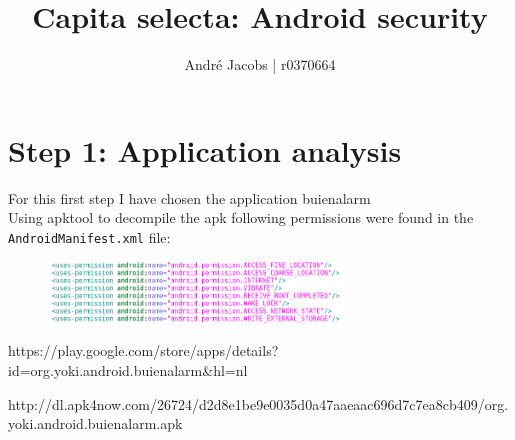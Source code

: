 \documentclass[10pt,a4paper]{article}
\author{André Jacobs | r0370664}
\title{Capita selecta: Android security}
\begin{document}
\maketitle

\section{Step 1: Application analysis}
For this first step I have chosen the application buienalarm
\cite{playlink1}\cite{apklink1}\\
Using apktool to decompile the apk following permissions were found in the
\texttt{AndroidManifest.xml} file:\\
\begin{figure}[h!]
  \includegraphics[width=0.7\textwidth]{manifest1}
\end{figure}

\begin{thebibliography}{9}
  
  https://play.google.com/store/apps/details?id=org.yoki.android.buienalarm&hl=nl


  http://dl.apk4now.com/26724/d2d8e1be9e0035d0a47aaeaac696d7c7ea8cb409/org.yoki.android.buienalarm.apk
\end{thebibliography}
\end{document}
